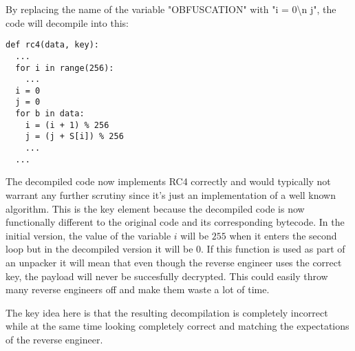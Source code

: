 \documentclass[twocolumn]{article}
\begin{document}
By replacing the name of the variable "OBFUSCATION" with "i = 0\textbackslash n  j", the code will decompile into this:

\begin{verbatim}
def rc4(data, key):
  ...
  for i in range(256):
    ...
  i = 0
  j = 0
  for b in data:
    i = (i + 1) % 256
    j = (j + S[i]) % 256
    ...
  ...
\end{verbatim}

The decompiled code now implements RC4 correctly and would typically not warrant any further scrutiny since it's just an implementation of a well known algorithm. This is the key element because the decompiled code is now functionally different to the original code and its corresponding bytecode. In the initial version, the value of the variable $i$ will be $255$ when it enters the second loop but in the decompiled version it will be $0$. If this function is used as part of an unpacker it will mean that even though the reverse engineer uses the correct key, the payload will never be succesfully decrypted. This could easily throw many reverse engineers off and make them waste a lot of time.

The key idea here is that the resulting decompilation is completely incorrect while at the same time looking completely correct and matching the expectations of the reverse engineer.


\end{document}

